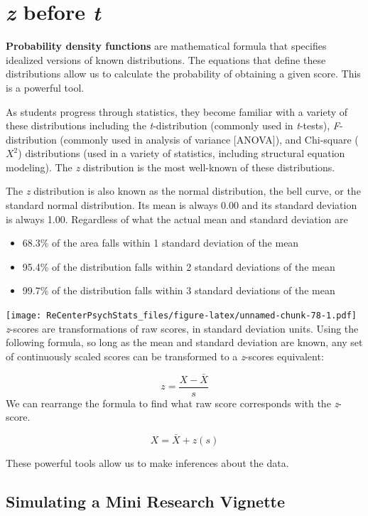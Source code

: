 \documentclass[
  11pt,
]{book}
\providecommand{\tightlist}{%
  \setlength{\itemsep}{0pt}\setlength{\parskip}{0pt}}
\begin{document}
\hypertarget{z-before-t}{%
\section{\texorpdfstring{\emph{z} before \emph{t}}{z before t}}\label{z-before-t}}

\textbf{Probability density functions} are mathematical formula that specifies idealized versions of known distributions. The equations that define these distributions allow us to calculate the probability of obtaining a given score. This is a powerful tool.

As students progress through statistics, they become familiar with a variety of these distributions including the \emph{t}-distribution (commonly used in \emph{t}-tests), \emph{F}-distribution (commonly used in analysis of variance {[}ANOVA{]}), and Chi-square (\(X^2\)) distributions (used in a variety of statistics, including structural equation modeling). The \emph{z} distribution is the most well-known of these distributions.

The \emph{z} distribution is also known as the normal distribution, the bell curve, or the standard normal distribution. Its mean is always 0.00 and its standard deviation is always 1.00. Regardless of what the actual mean and standard deviation are

\begin{itemize}
\tightlist
\item
  68.3\% of the area falls within 1 standard deviation of the mean
\item
  95.4\% of the distribution falls within 2 standard deviations of the mean
\item
  99.7\% of the distribution falls within 3 standard deviations of the mean
\end{itemize}

\texttt{[image: ReCenterPsychStats\_files/figure-latex/unnamed-chunk-78-1.pdf]}
\emph{z}-scores are transformations of raw scores, in standard deviation units. Using the following formula, so long as the mean and standard deviation are known, any set of continuously scaled scores can be transformed to a \emph{z}-scores equivalent:

\[z=\frac{X-\bar{X}}{s}\]
We can rearrange the formula to find what raw score corresponds with the \emph{z}-score.

\[X = \bar{X} + z(s)\]

These powerful tools allow us to make inferences about the data.

\hypertarget{simulating-a-mini-research-vignette}{%
\subsection{Simulating a Mini Research Vignette}\label{simulating-a-mini-research-vignette}}
\end{document}
